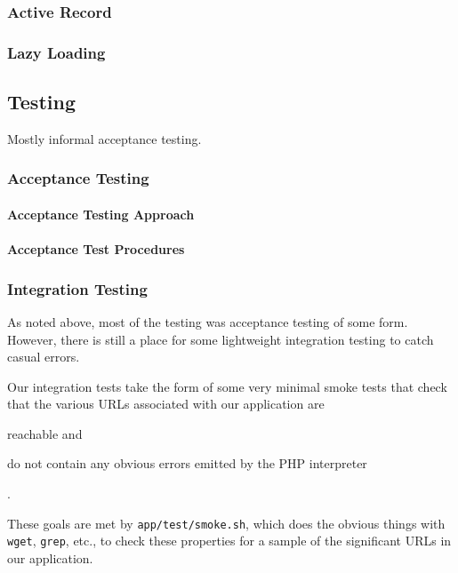 \subsubsection{Active Record}

\subsubsection{Lazy Loading}

\subsection{Testing}

Mostly informal acceptance testing.

\subsubsection{Acceptance Testing}

\paragraph{Acceptance Testing Approach}

\paragraph{Acceptance Test Procedures}

\subsubsection{Integration Testing}

As noted above, most of the testing was acceptance testing of some
form. However, there is still a place for some lightweight integration
testing to catch casual errors.

Our integration tests take the form of some very minimal smoke tests
that check that the various URLs associated with our application are
\begin{inparaenum}
\item reachable and
\item do not contain any obvious errors emitted by the PHP interpreter
\end{inparaenum}.

These goals are met by \verb!app/test/smoke.sh!, which does the
obvious things with \texttt{wget}, \texttt{grep}, etc., to check these
properties for a sample of the significant URLs in our application.

